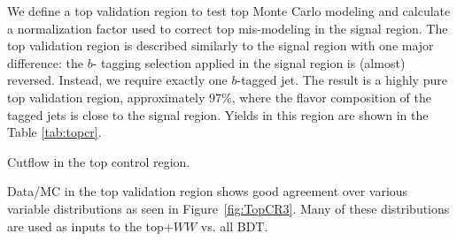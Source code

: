We define a top validation region to test top Monte Carlo modeling and calculate a normalization factor used to correct top mis-modeling in the signal region. The top validation region is described similarly to the signal region with one major difference: the $b$- tagging selection applied in the signal region is (almost) reversed. Instead, we require exactly one $b$-tagged jet. The result is a highly pure top validation region, approximately $97\%$, where the flavor composition of the tagged jets is close to the signal region. Yields in this region are shown in the Table \ref{tab:topcr}.

\begin{table}[h!]
\centering
\scalebox{0.65}{

}
\caption{Cutflow in the top control region.}
\label{tab:topcr}
\end{table}

Data/MC in the top validation region shows good agreement over various variable distributions as seen in Figure~\ref{fig:TopCR3}. Many of these distributions are used as inputs to the top$+WW$ vs. all BDT. 


